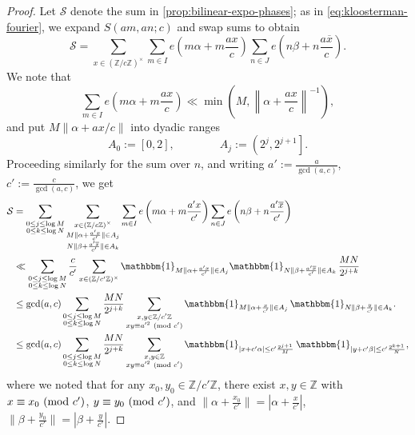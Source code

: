 \documentclass[reqno,11pt]{amsart}
\theoremstyle{remark}
\numberwithin{equation}{section}
\newcommand{\Z}{\mathbb{Z}}
\newcommand{\mS}{\mathcal{S}}
\newcommand{\one}{\mathbbm{1}}
\renewcommand{\bar}{\overline}
\renewcommand{\pmod}[1]{\ (\textnormal{mod } #1)}
\begin{document}
\begin{proof}
Let $\mS$ denote the sum in \cref{prop:bilinear-expo-phases}; as in \cref{eq:kloosterman-fourier}, we expand $S(am, an; c)$ and swap sums to obtain
\[
    \mS = \sum_{x \in (\Z/c\Z)^\times} 
    \sum_{m \in I} e\left(m\alpha + m\frac{ax}{c}\right)
    \sum_{n \in J} e\left(n\beta + n\frac{a\bar{x}}{c}\right).
\]
We note that
\[
    \sum_{m \in I} e\left(m\alpha + m\frac{ax}{c}\right) \ll 
    \min\left(M, \left\| \alpha + \frac{ax}{c}\right\|^{-1}\right),
\]
and put $M \|\alpha + ax/c\|$ into dyadic ranges
\[
    A_0 := \left[0, 2\right], \qquad\qquad 
    A_j := \left(2^j, 2^{j+1} \right].
\]
Proceeding similarly for the sum over $n$, and writing $a' := \tfrac{a}{\gcd(a, c)}$, $c' := \tfrac{c}{\gcd(a, c)}$, we get
\[
\begin{aligned}
    \mS &= 
    \sum_{\substack{0 \le j \le \log M \\ 0 \le k \le \log N}}
    \sum_{\substack{x \in (\Z/c\Z)^\times \\ M \|\alpha + \frac{a'x}{c'}\| \in A_j \\ N \|\beta + \frac{a'\bar{x}}{c'}\| \in A_k}}
    \sum_{m \in I} e\left(m\alpha + m\frac{a'x}{c'}\right)
    \sum_{n \in J} e\left(n\beta + n\frac{a'\bar{x}}{c'}\right)
    \\
    &\ll 
    \sum_{\substack{0 \le j \le \log M \\ 0 \le k \le \log N}} 
    \frac{c}{c'} \sum_{x \in (\Z/c'\Z)^\times}
    \one_{M \|\alpha + \frac{a'x}{c'}\| \in A_j}
    \one_{N \|\beta + \frac{a'\bar{x}}{c'}\| \in A_k}\,
    \frac{M N}{2^{j+k}}
    \\
    &\le 
    \gcd(a, c)
    \sum_{\substack{0 \le j \le \log M \\ 0 \le k \le \log N}} \frac{M N}{2^{j+k}}
    \sum_{\substack{x, y \in \Z/c'\Z \\ xy \equiv a'^2 \pmod{c'}}}
    \one_{M\|\alpha + \frac{x}{c'}\| \in A_j}\,
    \one_{N\|\beta + \frac{y}{c'}\| \in A_k}.
    \\
    &\le 
    \gcd(a, c)
    \sum_{\substack{0 \le j \le \log M \\ 0 \le k \le \log N}} \frac{M N}{2^{j+k}}
    \sum_{\substack{x, y \in \Z \\ xy \equiv a'^2 \pmod{c'}}}
    \one_{|x + c'\alpha| \le c'\frac{2^{j+1}}{M}}\,
    \one_{|y + c'\beta| \le c'\frac{2^{k+1}}{N}},
\end{aligned}
\]
where we noted that for any $x_0, y_0 \in \Z/c'\Z$, there exist $x, y \in \Z$ with $x \equiv x_0 \pmod{c'}$, $y \equiv y_0 \pmod{c'}$, and $\|\alpha + \frac{x_0}{c'}\| = |\alpha + \frac{x}{c'}|$, $\|\beta + \frac{y_0}{c'}\| = |\beta + \frac{y}{c'}|$.


\end{proof}
\end{document}
